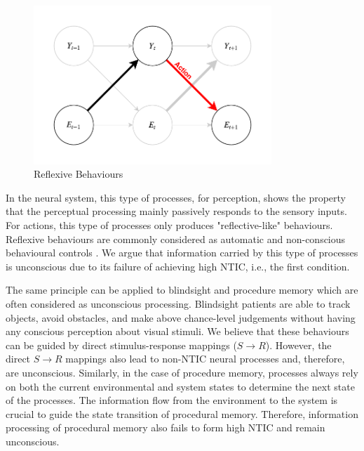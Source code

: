 \documentclass[utf8]{article}
\begin{document}
            	
                
    		\begin{figure}[H]
    			\includegraphics[width=0.8\textwidth]{WritingMaterials/Fig_Reflexive/Reflexive.pdf}
    			\caption{Reflexive Behaviours}
    			\label{fig:reflexive}
    		\end{figure}        
            
            In the neural system, this type of processes, for perception, shows the property that the perceptual processing mainly passively responds to the sensory inputs. For actions, this type of processes only produces "reflective-like" behaviours. Reflexive behaviours are commonly considered as automatic and non-conscious behavioural controls \citep{casali2013theoretically}. We argue that information carried by this type of processes is unconscious due to its failure of achieving high NTIC, i.e., the first condition. 
            
            The same principle can be applied to blindsight and procedure memory  which are often considered as unconscious processing. Blindsight patients are able to track objects, avoid obstacles, and make above chance-level judgements without having any conscious perception about visual stimuli. We believe that these behaviours can be guided by direct stimulus-response mappings ($S\rightarrow{}R$). However, the direct $S\rightarrow{}R$ mappings also lead to non-NTIC neural processes  and, therefore, are unconscious. Similarly, in the case of procedure memory, processes always rely on both the current environmental and system states to determine the next state of the processes. The information flow from the environment to the system is crucial to guide the state transition of procedural memory. Therefore, information processing of procedural memory also fails to form high NTIC and remain unconscious. 
            
\end{document}
